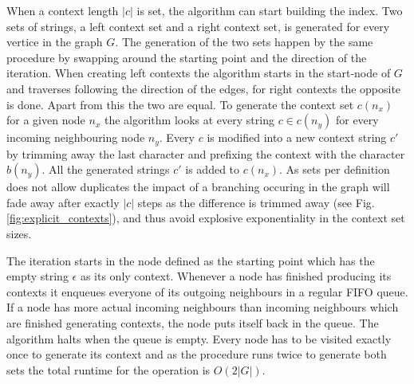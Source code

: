 \documentclass{article}
\begin{document}
When a context length $|c|$ is set, the algorithm can start building the index. Two sets of strings, a left context set and a right context set, is generated for every vertice in the graph $G$. The generation of the two sets happen by the same procedure by swapping around the starting point and the direction of the iteration. When creating left contexts the algorithm starts in the start-node of $G$ and traverses following the direction of the edges, for right contexts the opposite is done. Apart from this the two are equal. To generate the context set $c(n_x)$ for a given node $n_x$ the algorithm looks at every string $c \in c(n_y)$ for every incoming neighbouring node $n_y$. Every $c$ is modified into a new context string $c'$ by trimming away the last character and prefixing the context with the character $b(n_y)$. All the generated strings $c'$ is added to $c(n_x)$. As sets per definition does not allow duplicates the impact of a branching occuring in the graph will fade away after exactly $|c|$ steps as the difference is trimmed away (see Fig. \ref{fig:explicit_contexts}), and thus avoid explosive exponentiality in the context set sizes.\\
\par\noindent
The iteration starts in the node defined as the starting point which has the empty string $\epsilon$ as its only context. Whenever a node has finished producing its contexts it enqueues everyone of its outgoing neighbours in a regular FIFO queue. If a node has more actual incoming neighbours than incoming neighbours which are finished generating contexts, the node puts itself back in the queue. The algorithm halts when the queue is empty. Every node has to be visited exactly once to generate its context and as the procedure runs twice to generate both sets the total runtime for the operation is $O(2|G|)$.\\
\clearpage
\end{document}
